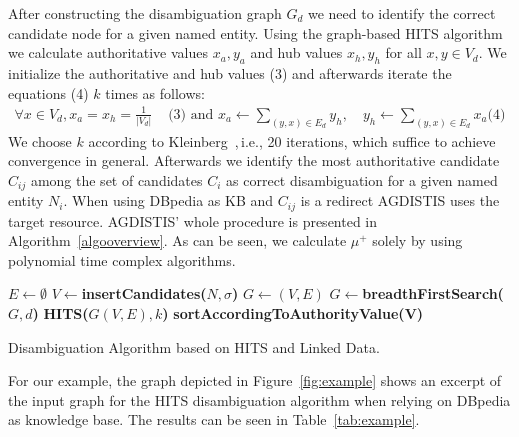 \documentclass{llncs}
\begin{document}
After constructing the disambiguation graph $G_d$ we need to identify the correct candidate node for a given named entity.
Using the graph-based HITS algorithm we calculate authoritative values $x_a,y_a$ and hub values $x_h,y_h$ for all $x,y\in V_d$.
We initialize the authoritative and hub values (3) and afterwards iterate the equations (4) $k$ times as follows: 
\begin{align*}
\forall x \in V_d, x_a=x_h=\frac{1}{|V_d|} &\text{ (3) and } 
x_a\longleftarrow  \sum_{(y,x)\in E_d} y_h, \quad
y_h\longleftarrow \sum_{(y,x)\in E_d} x_a \text{(4)}
\end{align*}
We choose $k$ according to Kleinberg~\cite{HITS},\,i.e., 20 iterations, which suffice to achieve convergence in general. %
Afterwards we identify the most authoritative candidate $C_{ij}$ among the set of candidates $C_i$ as correct disambiguation for a given named entity $N_i$. %
When using DBpedia as KB and $C_{ij}$ is a redirect AGDISTIS uses the target resource. %
AGDISTIS' whole procedure is presented in Algorithm~\ref{algooverview}.
As can be seen, we calculate $\mu^{+}$ solely by using polynomial time complex algorithms.
\begin{algorithm}
$E \longleftarrow \emptyset$\;
$V \longleftarrow${\bf insertCandidates($N, \sigma$)}\;
$G \longleftarrow (V,E)$\;
$G \longleftarrow${\bf breadthFirstSearch($G,d$)}\;
{\bf HITS($G(V,E), k$)}\;
{\bf sortAccordingToAuthorityValue(V)}\;
 {
}
\caption{Disambiguation Algorithm based on HITS and Linked Data.}\label{algooverview}
\end{algorithm}

For our example, the graph depicted in Figure~\ref{fig:example} shows an excerpt of the input graph for the HITS disambiguation algorithm when relying on DBpedia as knowledge base. 
The results can be seen in Table~\ref{tab:example}. 
\end{document}
